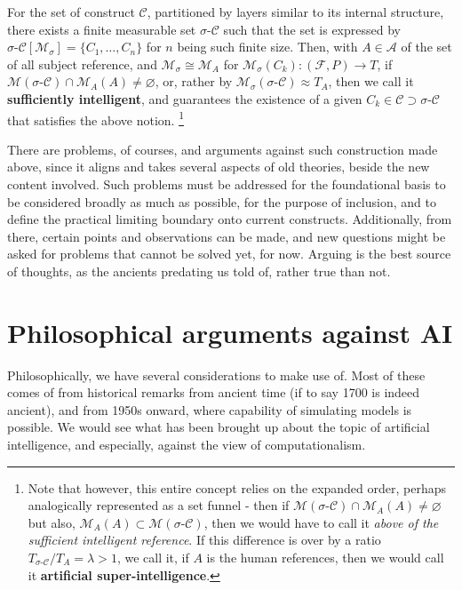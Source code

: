 \begin{theorem}
\begin{enumerate}
    \end{enumerate}
    For the set of construct $\mathcal{C}$, partitioned by layers similar to its internal structure, there exists a finite measurable set $\sigma\text{-}\mathcal{C}$ such that the set is expressed by $\sigma\text{-}\mathcal{C}[\mathcal{M}_{\sigma}]=\{C_{1},\dots,C_{n}\}$ for $n$ being such finite size. Then, with $A\in \mathcal{A}$ of the set of all subject reference, and $\mathcal{M}_{\sigma}\cong \mathcal{M}_{A}$ for $\mathcal{M}_{\sigma}(C_{k}): (\mathcal{F},P)\to T$, if $\mathcal{M}(\sigma\text{-}\mathcal{C})\cap \mathcal{M}_{A}(A)\neq \varnothing$, or, rather by $\mathcal{M}_{\sigma}(\sigma\text{-}\mathcal{C})\approx T_{A}$, then we call it \textbf{sufficiently intelligent}, and guarantees the existence of a given $C_{k}\in \mathcal{C}\supset \mathcal{\sigma\text{-}\mathcal{C}}$ that satisfies the above notion. \footnote{Note that however, this entire concept relies on the expanded order, perhaps analogically represented as a set funnel - then if $\mathcal{M}(\sigma\text{-}\mathcal{C})\cap \mathcal{M}_{A}(A)\neq \varnothing$ but also, $\mathcal{M}_{A}(A)\subset\mathcal{M}(\sigma\text{-}\mathcal{C})$, then we would have to call it \textit{above of the sufficient intelligent reference}. If this difference is over by a ratio $T_{\sigma\text{-}\mathcal{C}}/T_{A} = \lambda > 1$, we call it, if $A$ is the human references, then we would call it \textbf{artificial super-intelligence}.}
\end{theorem}
There are problems, of courses, and arguments against such construction made above, since it aligns and takes several aspects of old theories, beside the new content involved. Such problems must be addressed for the foundational basis to be considered broadly as much as possible, for the purpose of inclusion, and to define the practical limiting boundary onto current constructs. Additionally, from there, certain points and observations can be made, and new questions might be asked for problems that cannot be solved yet, for now. Arguing is the best source of thoughts, as the ancients predating us told of, rather true than not.

\section{Philosophical arguments against AI}
Philosophically, we have several considerations to make use of. Most of these comes of from historical remarks from ancient time (if to say 1700 is indeed ancient), and from 1950s onward, where capability of simulating models is possible. We would see what has been brought up about the topic of artificial intelligence, and especially, against the view of computationalism. 

